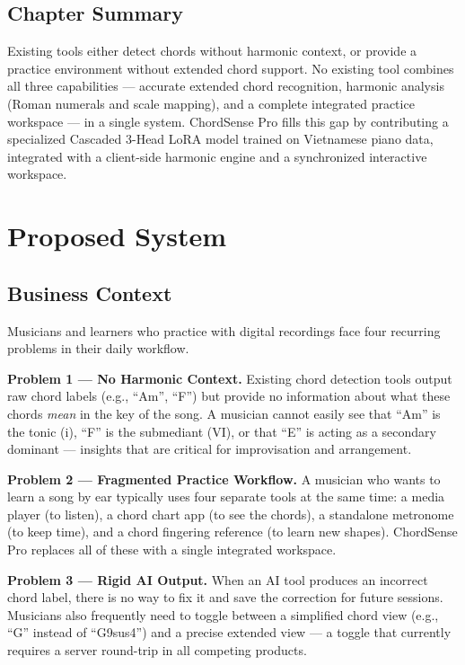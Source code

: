 \documentclass[a4paper]{article}
\begin{document}
\subsection{Chapter Summary}

Existing tools either detect chords without harmonic context, or provide a practice environment without extended chord support. No existing tool combines all three capabilities --- accurate extended chord recognition, harmonic analysis (Roman numerals and scale mapping), and a complete integrated practice workspace --- in a single system. ChordSense Pro fills this gap by contributing a specialized Cascaded 3-Head LoRA model trained on Vietnamese piano data, integrated with a client-side harmonic engine and a synchronized interactive workspace.

\newpage
\section{Proposed System}\label{sec:proposed_system}

\subsection{Business Context}

Musicians and learners who practice with digital recordings face four recurring problems in their daily workflow.

\textbf{Problem 1 --- No Harmonic Context.} Existing chord detection tools output raw chord labels (e.g., ``Am'', ``F'') but provide no information about what these chords \emph{mean} in the key of the song. A musician cannot easily see that ``Am'' is the tonic (i), ``F'' is the submediant (VI), or that ``E'' is acting as a secondary dominant --- insights that are critical for improvisation and arrangement.

\textbf{Problem 2 --- Fragmented Practice Workflow.} A musician who wants to learn a song by ear typically uses four separate tools at the same time: a media player (to listen), a chord chart app (to see the chords), a standalone metronome (to keep time), and a chord fingering reference (to learn new shapes). ChordSense Pro replaces all of these with a single integrated workspace.

\textbf{Problem 3 --- Rigid AI Output.} When an AI tool produces an incorrect chord label, there is no way to fix it and save the correction for future sessions. Musicians also frequently need to toggle between a simplified chord view (e.g., ``G'' instead of ``G9sus4'') and a precise extended view --- a toggle that currently requires a server round-trip in all competing products.
\end{document}
